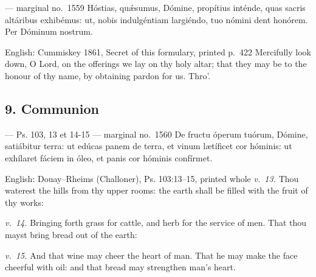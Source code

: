 \begin{appointedlatin}{ --- marginal no.\ 1559}
Hóstias, quǽsumus, Dómine, propítius inténde, quas sacris altáribus
exhibémus: ut, nobis indulgéntiam largiéndo, tuo nómini dent honórem. Per
Dóminum nostrum.
\end{appointedlatin}


\begin{namedtranslation}{English: Cummiskey 1861, Secret of this formulary, printed p.\ 422}
Mercifully look down, O Lord, on the offerings we lay on thy holy altar; that
they may be to the honour of thy name, by obtaining pardon for us. Thro'.
\end{namedtranslation}


\elementguard
\subsection*{9. Communion }

\begin{appointedlatin}{ --- Ps. 103, 13 et 14-15 --- marginal no.\ 1560}
De fructu óperum tuórum, Dómine, satiábitur terra: ut edúcas panem de terra,
et vinum lætíficet cor hóminis: ut exhílaret fáciem in óleo, et panis cor
hóminis confírmet.
\end{appointedlatin}

\begin{namedtranslation}{English: Douay--Rheims (Challoner), Ps. 103:13--15, printed whole}
\textit{v.~13.} Thou waterest the hills from thy upper rooms: the earth shall
be filled with the fruit of thy works:

\textit{v.~14.} Bringing forth grass for cattle, and herb for the service of
men. That thou mayst bring bread out of the earth:

\textit{v.~15.} And that wine may cheer the heart of man. That he may make the
face cheerful with oil: and that bread may strengthen man's heart.
\end{namedtranslation}

